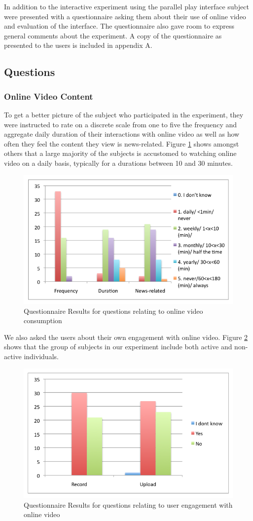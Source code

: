 In addition to the interactive experiment using the parallel play interface subject were presented with a questionnaire asking them about their use of online video and evaluation of the interface. The questionnaire also gave room to express general comments about the experiment. A copy of the questionnaire as presented to the users is included in appendix A.

\subsection{Questions} %
\label{sub:questions}

\subsubsection{Online Video Content}
To get a better picture of the subject who participated in the experiment, they were instructed to rate on a discrete scale from one to five the frequency and aggregate daily duration of their interactions with online video as well as how often they feel the content they view is news-related. Figure \ref{fig:quest_consumption} shows amongst others that a large majority of the subjects is accustomed to watching online video on a daily basis, typically for a durations between 10 and 30 minutes.

\begin{figure}[htbp]
  \centering
    \includegraphics[width=.6\textwidth]{img/evaluation/quest_consumption}
  \caption{Questionnaire Results for questions relating to online video consumption}
  \label{fig:quest_consumption}
\end{figure}

We also asked the users about their own engagement with online video. Figure \ref{fig:quest_own_content} shows that the group of subjects in our experiment include both active and non-active individuals.

\begin{figure}[htbp]
  \centering
    \includegraphics[width=.6\textwidth]{img/evaluation/quest_video}
  \caption{Questionnaire Results for questions relating to user engagement with online video}
  \label{fig:quest_own_content}
\end{figure}



